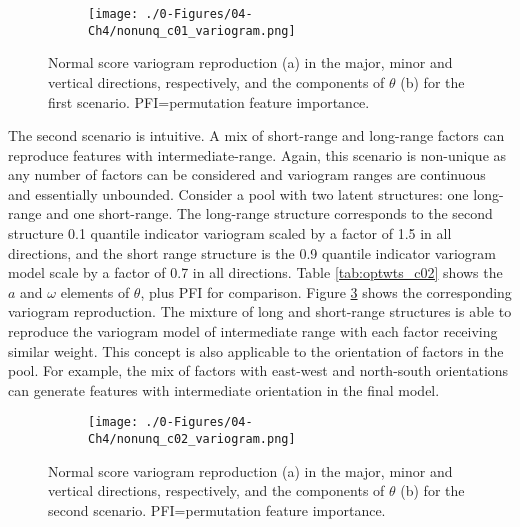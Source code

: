 \begin{figure}
    \begin{subfigure}{1.\textwidth}
        \centering
        \texttt{[image: ./0-Figures/04-Ch4/nonunq\_c01\_variogram.png]}
        \caption{}
        \label{fig:nonunq_c01_variogram}
    \end{subfigure}
    \begin{subtable}{1.\textwidth}
        \centering
        \resizebox{1\width}{!}{}
        \caption{}
        \label{tab:optwts_c01}
    \end{subtable}
    \caption{Normal score variogram reproduction (a) in the major, minor and vertical directions, respectively, and the components of $\theta$ (b) for the first scenario. PFI=permutation feature importance. }
    \label{}
\end{figure}

The second scenario is intuitive. A mix of short-range and long-range factors can reproduce features with intermediate-range. Again, this scenario is non-unique as any number of factors can be considered and variogram ranges are continuous and essentially unbounded. Consider a pool with two latent structures: one long-range and one short-range. The long-range structure corresponds to the second structure 0.1 quantile indicator variogram scaled by a factor of 1.5 in all directions, and the short range structure is the 0.9 quantile indicator variogram model scale by a factor of 0.7 in all directions. Table \ref{tab:optwts_c02} shows the $a$ and $\omega$ elements of $\theta$, plus \gls{PFI} for comparison. Figure \ref{fig:nonunq_c02_variogram} shows the corresponding variogram reproduction. The mixture of long and short-range structures is able to reproduce the variogram model of intermediate range with each factor receiving similar weight. This concept is also applicable to the orientation of factors in the pool. For example, the mix of factors with east-west and north-south orientations can generate features with intermediate orientation in the final model.

\begin{figure}
    \begin{subfigure}{1.\textwidth}
        \centering
        \texttt{[image: ./0-Figures/04-Ch4/nonunq\_c02\_variogram.png]}
        \caption{}
        \label{fig:nonunq_c02_variogram}
    \end{subfigure}
    \begin{subtable}{1.\textwidth}
        \centering
        \resizebox{1\width}{!}{}
        \caption{}
        \label{tab:optwts_c02}
    \end{subtable}
    \caption{Normal score variogram reproduction (a) in the major, minor and vertical directions, respectively, and the components of $\theta$ (b) for the second scenario. PFI=permutation feature importance. }
    \label{}
\end{figure}

